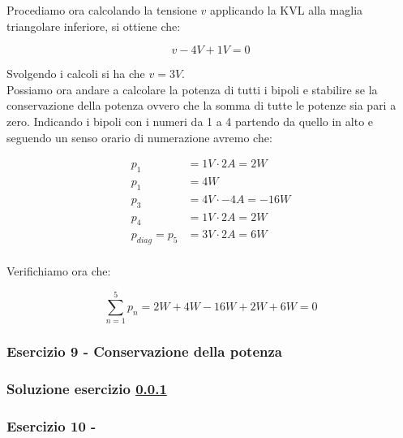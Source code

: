 \documentclass[../main.tex]{subfiles}
\begin{document}
Procediamo ora calcolando la tensione $v$ applicando la KVL alla maglia triangolare inferiore, si ottiene che:

\begin{equation}
	v - 4\unit{V} + 1\unit{V} = 0  
\end{equation}

Svolgendo i calcoli si ha che $v = 3\unit{V}$.\\

Possiamo ora andare a calcolare la potenza di tutti i bipoli e stabilire se la conservazione della potenza ovvero che la somma di tutte le potenze sia pari a zero. Indicando i bipoli con i numeri da 1 a 4 partendo da quello in alto e seguendo un senso orario di numerazione avremo che:

\begin{equation}
\begin{aligned}
	p_1 &= 1\unit{V} \cdot 2\unit{A} = 2\unit{W} \\
	p_1 &= 4\unit{W} \\
	p_3 &= 4\unit{V} \cdot - 4\unit{A} = -16\unit{W} \\
	p_4 &= 1\unit{V} \cdot 2\unit{A} = 2\unit{W} \\
	p_{diag} = p_5 &= 3\unit{V} \cdot 2\unit{A} = 6\unit{W} \\
\end{aligned}
\end{equation}

Verifichiamo ora che:

\begin{equation}
	\sum_{n=1}^5 p_n = 2\unit{W} + 4\unit{W} -16\unit{W} +  2\unit{W} +  6\unit{W} = 0
\end{equation}



\vspace*{1.5cm}
\subsubsection{Esercizio 9 - Conservazione della potenza}
\label{e1e9}

\subsubsection*{Soluzione esercizio \ref{e1e9}}

\vspace*{1.5cm}
\subsubsection{Esercizio 10 - }
\label{e1e10}
\end{document}
